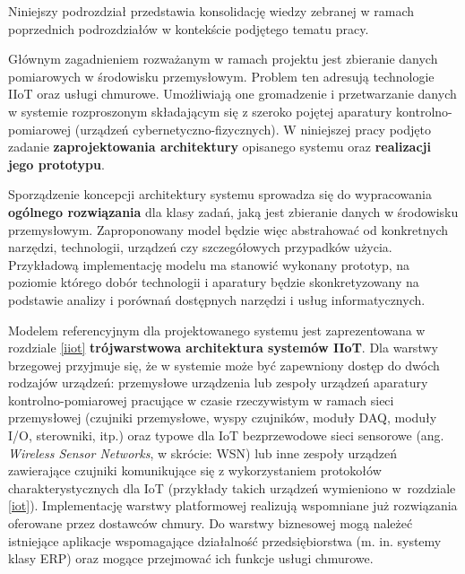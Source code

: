 \documentclass[a4paper, 12pt, twoside]{article}
\begin{document}
Niniejszy podrozdział przedstawia konsolidację wiedzy zebranej w ramach poprzednich
podrozdziałów w kontekście podjętego tematu pracy. 

Głównym zagadnieniem rozważanym
w ramach projektu jest zbieranie danych pomiarowych w środowisku
przemysłowym. Problem ten adresują technologie IIoT oraz usługi chmurowe.
Umożliwiają one gromadzenie i przetwarzanie danych w systemie rozproszonym składającym
się z szeroko pojętej aparatury kontrolno-pomiarowej (urządzeń cybernetyczno-fizycznych).
W niniejszej pracy podjęto zadanie \textbf{zaprojektowania architektury} opisanego systemu
oraz \textbf{realizacji jego prototypu}.

Sporządzenie koncepcji architektury systemu sprowadza się do wypracowania
\textbf{ogólnego rozwiązania} dla klasy zadań, jaką jest zbieranie danych w środowisku przemysłowym.
Zaproponowany model będzie więc abstrahować od konkretnych narzędzi, technologii,
urządzeń czy szczegółowych przypadków użycia. Przykładową implementację modelu ma 
stanowić wykonany prototyp, na poziomie którego dobór technologii
i aparatury będzie skonkretyzowany na podstawie analizy i porównań dostępnych
narzędzi i usług informatycznych. 

Modelem referencyjnym dla projektowanego systemu jest zaprezentowana w rozdziale
\ref{iiot} \textbf{trójwarstwowa architektura systemów IIoT}. Dla warstwy brzegowej przyjmuje 
się, że w systemie może być zapewniony dostęp do dwóch rodzajów urządzeń: przemysłowe urządzenia
lub zespoły urządzeń aparatury kontrolno-pomiarowej pracujące w czasie rzeczywistym 
w ramach sieci przemysłowej
(czujniki przemysłowe, wyspy czujników, moduły DAQ, moduły I/O, sterowniki, itp.)
oraz typowe dla IoT bezprzewodowe sieci sensorowe (ang. \emph{Wireless Sensor Networks}, w skrócie: WSN)
lub inne zespoły urządzeń zawierające czujniki komunikujące się z wykorzystaniem protokołów charakterystycznych dla IoT
\cite{iiot-gateway-introduction}
(przykłady takich urządzeń wymieniono w~rozdziale \ref{iot}). Implementację warstwy
platformowej realizują wspomniane już rozwiązania oferowane przez dostawców chmury.
Do warstwy biznesowej mogą należeć istniejące aplikacje 
wspomagające działalność przedsiębiorstwa 
(m. in. systemy klasy ERP) oraz mogące przejmować ich funkcje usługi chmurowe. 
\end{document}
